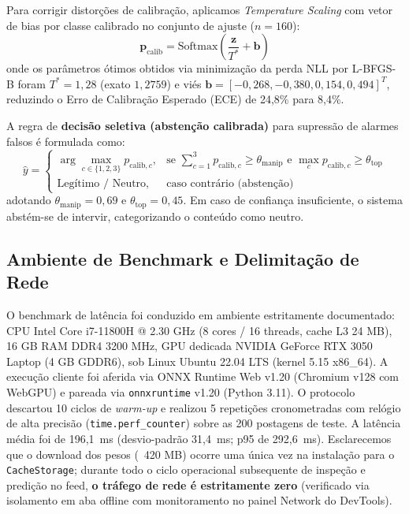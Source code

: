 \documentclass[runningheads]{llncs}
\begin{document}
Para corrigir distorções de calibração, aplicamos \textit{Temperature Scaling} com vetor de bias por classe calibrado no conjunto de ajuste ($n=160$):
\begin{equation}
\mathbf{p}_{\text{calib}} = \text{Softmax}\left(\frac{\mathbf{z}}{T^*} + \mathbf{b}\right)
\end{equation}
onde os parâmetros ótimos obtidos via minimização da perda NLL por L-BFGS-B foram $T^* = 1{,}28$ (exato $1{,}2759$) e viés $\mathbf{b} = [-0{,}268, -0{,}380, 0{,}154, 0{,}494]^T$, reduzindo o Erro de Calibração Esperado (ECE) de 24,8\% para 8,4\%.

A regra de \textbf{decisão seletiva (abstenção calibrada)} para supressão de alarmes falsos é formulada como:
\begin{equation}
\hat{y} = \begin{cases} 
\arg\max_{c \in \{1,2,3\}} p_{\text{calib}, c}, & \text{se } \sum_{c=1}^3 p_{\text{calib}, c} \ge \theta_{\text{manip}} \text{ e } \max_c p_{\text{calib}, c} \ge \theta_{\text{top}} \\ 
\text{Legítimo / Neutro}, & \text{caso contrário (abstenção)} 
\end{cases}
\end{equation}
adotando $\theta_{\text{manip}} = 0{,}69$ e $\theta_{\text{top}} = 0{,}45$. Em caso de confiança insuficiente, o sistema abstém-se de intervir, categorizando o conteúdo como neutro.

\subsection{Ambiente de Benchmark e Delimitação de Rede}

O benchmark de latência foi conduzido em ambiente estritamente documentado: CPU Intel Core i7-11800H @ 2.30 GHz (8 cores / 16 threads, cache L3 24 MB), 16 GB RAM DDR4 3200 MHz, GPU dedicada NVIDIA GeForce RTX 3050 Laptop (4 GB GDDR6), sob Linux Ubuntu 22.04 LTS (kernel 5.15 x86\_64). A execução cliente foi aferida via ONNX Runtime Web v1.20 (Chromium v128 com WebGPU) e pareada via \texttt{onnxruntime} v1.20 (Python 3.11). O protocolo descartou 10 ciclos de \textit{warm-up} e realizou 5 repetições cronometradas com relógio de alta precisão (\texttt{time.perf\_counter}) sobre as 200 postagens de teste. A latência média foi de 196,1~ms (desvio-padrão 31,4~ms; p95 de 292,6~ms). Esclarecemos que o download dos pesos (~420 MB) ocorre uma única vez na instalação para o \texttt{CacheStorage}; durante todo o ciclo operacional subsequente de inspeção e predição no feed, \textbf{o tráfego de rede é estritamente zero} (verificado via isolamento em aba offline com monitoramento no painel Network do DevTools).
\end{document}
